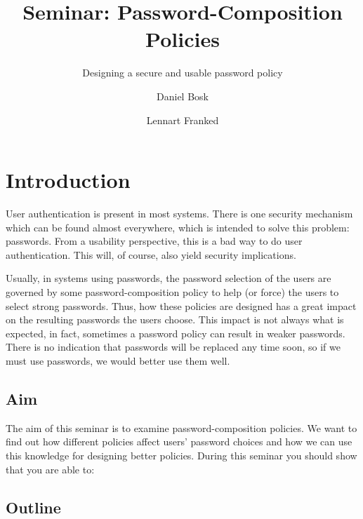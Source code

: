 \title{Seminar: Password-Composition Policies}
\subtitle{Designing a secure and usable password policy}

\author{%
  Daniel Bosk
  \and
  Lennart Franked
}

\maketitle

\begin{abstract}
  
\end{abstract}


\section{Introduction}
\label{sec:intro}
User authentication is present in most systems.
There is one security mechanism which can be found almost everywhere, which is 
intended to solve this problem: passwords.
From a usability perspective, this is a bad way to do user authentication.
This will, of course, also yield security implications.

Usually, in systems using passwords, the password selection of the users are 
governed by some password-composition policy to help (or force) the users to 
select strong passwords.
Thus, how these policies are designed has a great impact on the resulting 
passwords the users choose.
This impact is not always what is expected, in fact, sometimes a password 
policy can result in weaker passwords.
There is no indication that passwords will be replaced any time soon, so if we 
must use passwords, we would better use them well.

\subsection{Aim}
\label{sec:Syfte}
The aim of this seminar is to examine password-composition policies.
We want to find out how different policies affect users' password choices and 
how we can use this knowledge for designing better policies.
During this seminar you should show that you are able to:
\begin{itemize}
	
\end{itemize}

\subsection{Outline}

